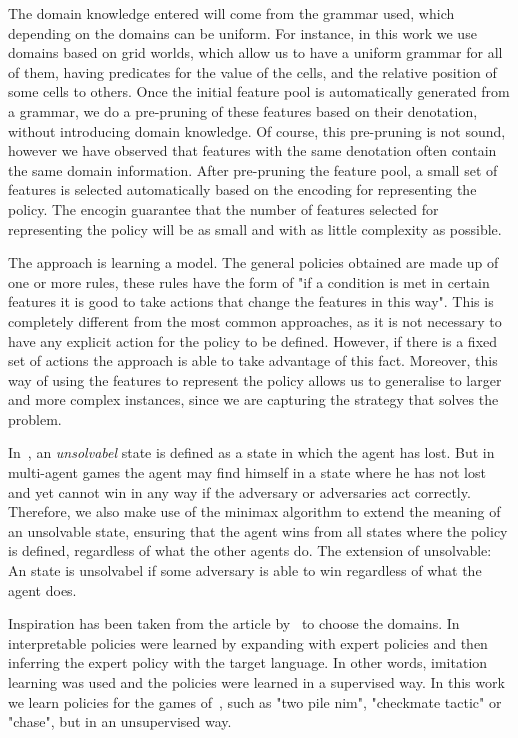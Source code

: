 \documentclass[a4paper]{article}
\begin{document}
The domain knowledge entered will come from the grammar used, which depending on the domains can be uniform. For instance, in this work we use domains based on grid worlds, which allow us to have a uniform grammar for all of them, having predicates for the value of the cells, and the relative position of some cells to others. Once the initial feature pool is automatically generated from a grammar, we do a pre-pruning of these features based on their denotation, without introducing domain knowledge. Of course, this pre-pruning is not sound, however we have observed that features with the same denotation often contain the same domain information. After pre-pruning the feature pool, a small set of features is selected automatically based on the encoding for representing the policy. The encogin guarantee that the number of features selected for representing the policy will be as small and with as little complexity as possible.

The approach is learning a model. The general policies obtained are made up of one or more rules, these rules have the form of "if a condition is met in certain features it is good to take actions that change the features in this way". This is completely different from the most common approaches, as it is not necessary to have any explicit action for the policy to be defined. However, if there is a fixed set of actions the approach is able to take advantage of this fact. Moreover, this way of using the features to represent the policy allows us to generalise to larger and more complex instances, since we are capturing the strategy that solves the problem.

In~\cite{frances2021learning}, an \emph{unsolvabel} state is defined as a state in which the agent has lost. But in multi-agent games the agent may find himself in a state where he has not lost and yet cannot win in any way if the adversary or adversaries act correctly. Therefore, we also make use of the minimax algorithm to extend the meaning of an unsolvable state, ensuring that the agent wins from all states where the policy is defined, regardless of what the other agents do. The extension of unsolvable: An state is unsolvabel if some adversary is able to win regardless of what the agent does.

Inspiration has been taken from the article by~\cite{silver2020few} to choose the domains. In~\cite{silver2020few} interpretable policies were learned by expanding with expert policies and then inferring the expert policy with the target language. In other words, imitation learning was used and the policies were learned in a supervised way. In this work we learn policies for the games of~\cite{silver2020few}, such as "two pile nim", "checkmate tactic" or "chase", but in an unsupervised way.
\end{document}

